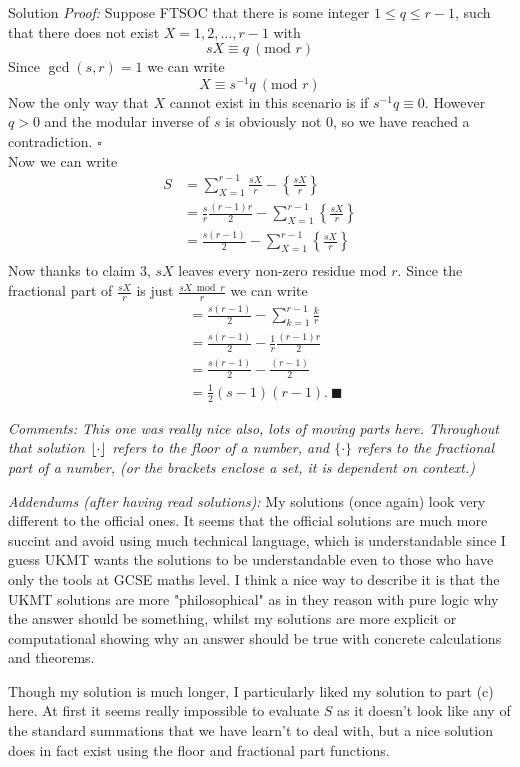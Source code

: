 \documentclass{article}
\begin{document}
\begin{solution}{Solution}
\textit{Proof:} Suppose FTSOC that there is some integer $1\leq q \leq r-1$,
such that there does not exist $X = 1, 2,\ldots,r-1$ with
$$
sX \equiv q \ (\text{mod } r)
$$
Since $\gcd(s,r) = 1$ we can write
$$
X \equiv s^{-1} q \ (\text{mod } r)
$$
Now the only way that $X$ cannot exist in this scenario is if
$s^{-1} q \equiv 0$. However $q > 0$ and the modular inverse of $s$ is
obviously not 0, so we have reached a contradiction. $\square$ \\

Now we can write
\[
\begin{aligned}
S &= \sum_{X=1}^{r-1} \frac{sX}{r} - \left\{ \frac{sX}{r} \right\} \\
&= \frac{s}{r} \frac{(r-1)r}{2} -
\sum_{X=1}^{r-1} \left\{ \frac{sX}{r} \right\} \\
&= \frac{s(r-1)}{2} -
\sum_{X=1}^{r-1} \left\{ \frac{sX}{r} \right\} \\
\end{aligned}
\]
Now thanks to claim 3, $sX$ leaves every non-zero residue mod $r$.
Since the fractional part of $\frac{sX}{r}$ is just
$\frac{sX \bmod r}{r}$ we can write
\[
\begin{aligned}
&= \frac{s(r-1)}{2} -
\sum_{k=1}^{r-1} \frac{k}{r} \\
&= \frac{s(r-1)}{2} - \frac{1}{r} \frac{(r-1)r}{2} \\
&= \frac{s(r-1)}{2} - \frac{(r-1)}{2} \\
&= \frac12 (s-1)(r-1). \ \blacksquare
\end{aligned}
\]

\textit{Comments: This one was really nice also, lots of moving parts here.
Throughout that solution $\left\lfloor \cdot \right\rfloor$ refers to the floor of a number,
and $\{ \cdot \}$ refers to the fractional part of a number, (or the
brackets enclose a set, it is dependent on context.)}
\\

\hline
\vspace{0.2cm}

\textit{Addendums (after having read solutions):} My solutions (once again)
look very different to the official ones. It seems that the official
solutions are much more succint and avoid using much technical language,
which is understandable since I guess UKMT wants the solutions to be
understandable even to those who have only the tools at GCSE maths level.
I think a nice way to describe it is that the UKMT solutions
are more "philosophical" as in they reason with pure logic why the answer
should be something, whilst my solutions are more explicit or computational
showing why an answer should be true with concrete calculations and
theorems.
\vspace{0.2cm}

Though my solution is much longer, I particularly liked my solution to
part (c) here. At first it seems really impossible to evaluate $S$
as it doesn't look like any of the standard summations that we have learn't
to deal with, but a nice solution does in fact exist using the floor and
fractional part functions.
\end{solution}
\end{document}
